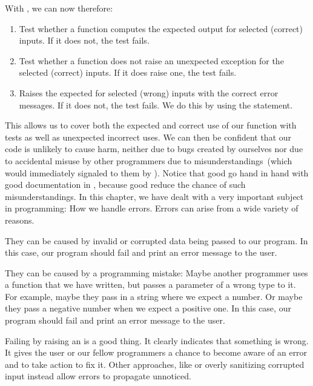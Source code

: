 With \pytest, we can now therefore:%
%
\begin{enumerate}%
%
\item Test whether a function computes the expected output for selected (correct) inputs. %
If it does not, the test fails.%
%
\item Test whether a function does not raise an unexpected exception for the selected (correct) inputs. %
If it does raise one, the test fails.%
%
\item Raises the expected  for selected (wrong) inputs with the correct error messages. %
If it does not, the test fails. %
We do this by using the  statement.%
%
\end{enumerate}%
%
This allows us to cover both the expected and correct use of our function with tests as well as unexpected incorrect uses.
We can then be confident that our code is unlikely to cause harm, neither due to bugs created by ourselves nor due to accidental misuse by other programmers due to misunderstandings~(which would immediately signaled to them by ).
Notice that good  go hand in hand with good documentation in , because good  reduce the chance of such misunderstandings.%
%
%
%
\FloatBarrier%
\endhsection%
%
%
In this chapter, we have dealt with a very important subject in programming:
How we handle errors.
Errors can arise from a wide variety of reasons.

They can be caused by invalid or corrupted data being passed to our program.
In this case, our program should fail and print an error message to the user.

They can be caused by a programming mistake:
Maybe another programmer uses a function that we have written, but passes a parameter of a wrong type to it.
For example, maybe they pass in a string where we expect a number.
Or maybe they pass a negative number when we expect a positive one.
In this case, our program should fail and print an error message to the user.

Failing by raising an  is a good thing.
It clearly indicates that something is wrong.
It gives the user or our fellow programmers a chance to become aware of an error and to take action to fix it.
Other approaches, like  or overly sanitizing corrupted input instead allow errors to propagate unnoticed.

